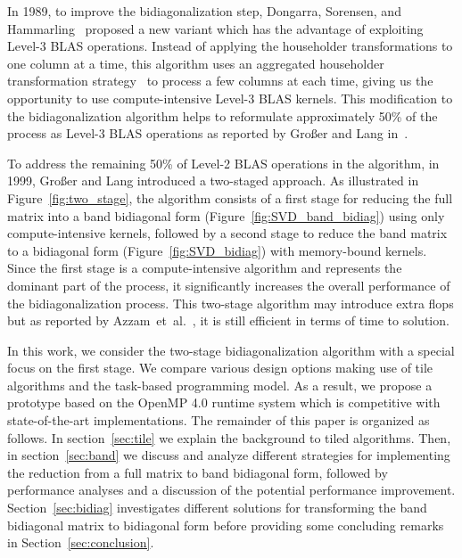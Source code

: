 In 1989, to improve the bidiagonalization step,
Dongarra, Sorensen, and Hammarling~\cite{dongarra1989block}
proposed a new variant which has the advantage of exploiting
Level-3 BLAS operations.
Instead of applying the householder transformations to
one column at a time,
this algorithm uses an aggregated householder transformation
strategy~\cite{bischof1987wy} to process a few columns at each time,
giving us the opportunity to use compute-intensive Level-3 BLAS kernels.
This modification to the bidiagonalization algorithm helps
to reformulate approximately 50\% of the process as Level-3 BLAS operations
as reported by Gro{\ss}er and Lang in~\cite{grosser1999efficient}.

To address the remaining 50\% of Level-2 BLAS operations in the
algorithm, in 1999, Gro{\ss}er and Lang introduced a two-staged
approach.
As illustrated in Figure~\ref{fig:two_stage}, the algorithm consists of
a first stage for reducing the full matrix into a
band bidiagonal form (Figure~\ref{fig:SVD_band_bidiag}) using only
compute-intensive kernels,
followed by a second stage to reduce the band
matrix to a bidiagonal form (Figure~\ref{fig:SVD_bidiag}) with
memory-bound kernels.
Since the first stage is a compute-intensive
algorithm and represents the dominant part of the process,
it significantly increases the overall performance of the
bidiagonalization process.
This two-stage algorithm may introduce extra flops
but as reported by Azzam~et~al\@.~\cite{haidar2013improved},
it is still efficient in terms of time to solution.

In this work, we consider the two-stage bidiagonalization algorithm
with a special focus on the first stage.
We compare various design options making use of tile algorithms and
the task-based programming model.
As a result,
we propose a prototype based on the OpenMP 4.0 runtime system which is
competitive with state-of-the-art implementations.
The remainder of this paper is organized as follows.
In section~\ref{sec:tile} we explain the background to tiled algorithms.
Then, in section~\ref{sec:band} we discuss and analyze
different strategies for implementing the
reduction from a full matrix to band bidiagonal form,
followed by performance analyses and a discussion of
the potential performance improvement.
Section~\ref{sec:bidiag} investigates different solutions
for transforming the band bidiagonal matrix
to bidiagonal form before providing some concluding
remarks in Section~\ref{sec:conclusion}.

